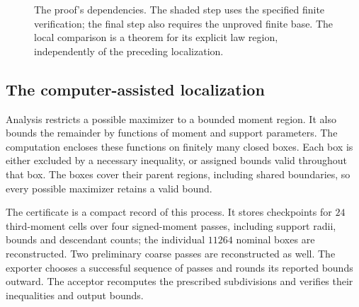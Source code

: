 \begin{figure}[ht]
\centering
{}
\caption{The proof's dependencies. The shaded step uses the specified
finite verification; the final step also requires the unproved finite base.
The local comparison is a theorem for its explicit law region, independently
of the preceding localization.}
\label{opus:proof-flow}
\end{figure}

\FloatBarrier
\subsection{The computer-assisted localization}
Analysis restricts a possible maximizer to a bounded moment region.
It also bounds the remainder by functions of moment and support
parameters. The computation encloses these functions on finitely many
closed boxes. Each box is either excluded by a necessary inequality,
or assigned bounds valid throughout that box. The boxes cover their
parent regions, including shared boundaries, so every possible
maximizer retains a valid bound.

The certificate is a compact record of this process. It stores
checkpoints for $24$ third-moment cells over four signed-moment passes,
including support radii, bounds and descendant counts; the individual
$11264$ nominal boxes are reconstructed. Two preliminary coarse passes
are reconstructed as well. The exporter chooses a successful sequence
of passes and rounds its reported bounds outward. The acceptor
recomputes the prescribed subdivisions and verifies their inequalities
and output bounds.

